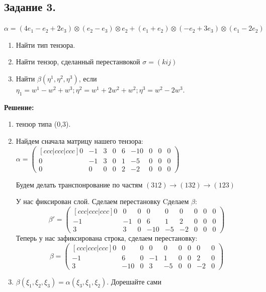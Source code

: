 \documentclass{article}
\begin{document}
\newpage
\subsection{Задание 3.}

$\alpha = (4e_1 - e_2 + 2e_3) \otimes (e_2-e_3)\otimes e_2 + (e_1 + e_2) \otimes (-e_2 + 3e_3 )\otimes (e_1 -2e_2) $
\begin{enumerate}
    \item Найти тип тензора.
    \item Найти тензор, сделанный перестанвокой $\sigma  = (kij)$
    \item Найти $\beta(\eta^1,\eta^2 ,\eta^3) $, если $\eta_1 = w^1 - w^2 + w^3; \eta^2 = w^1 + 2w^2 + w^2; \eta^3 = w^2 -2w^3$.
\end{enumerate}

\textbf{Решение:}

\begin{enumerate}
    \item тензор типа (0,3).
    \item Найдем сначала матрицу нашего тензора:
    $\alpha = \begin{pmatrix}[ccc|ccc|ccc]
        0 & -1& 3   & 0 & 6 & -10 & 0 & 0 & 0\\
        0 & -1& 3 & 0 & 1 & -5 &  0 & 0 & 0\\
        0 & 0 & 0 & 0 & 2 & -2 & 0 &  0 & 0
    \end{pmatrix}$

    Будем делать транспонрование по частям $(312) \rightarrow (132) \rightarrow (123)$

    У нас фиксирован слой. Сделаем перестановку
    Cделаем $\beta$:
    $$\beta' = \begin{pmatrix}[ccc|ccc|ccc]
        0 & 0& 0   & 0 & 0 & 0 & 0 & 0 & 0\\
        -1 & -1& 0 & 6 & 1 & 2 &  0 & 0 & 0\\
        3 & 3 & 0 & -10 & -5 & -2 & 0 &  0 & 0
    \end{pmatrix}$$
    Теперь у нас зафиксирована строка, сделаем перестановку:
    $$\beta = \begin{pmatrix}[ccc|ccc|ccc]
        0 & 0& 0   & 0 & 0 & 0 & 0 & 0 & 0\\
        -1 & 6& 0 & -1 & 1 & 0 &  0 & 2 & 0\\
        3 & -10 & 0 & 3 & -5 & 0 & 0 &  -2 & 0
    \end{pmatrix}$$

    \item $\beta (\xi_1,\xi_2,\xi_3) = \alpha (\xi_3,\xi_1,\xi_2)$. Дорешайте сами
\end{enumerate}
\end{document}
